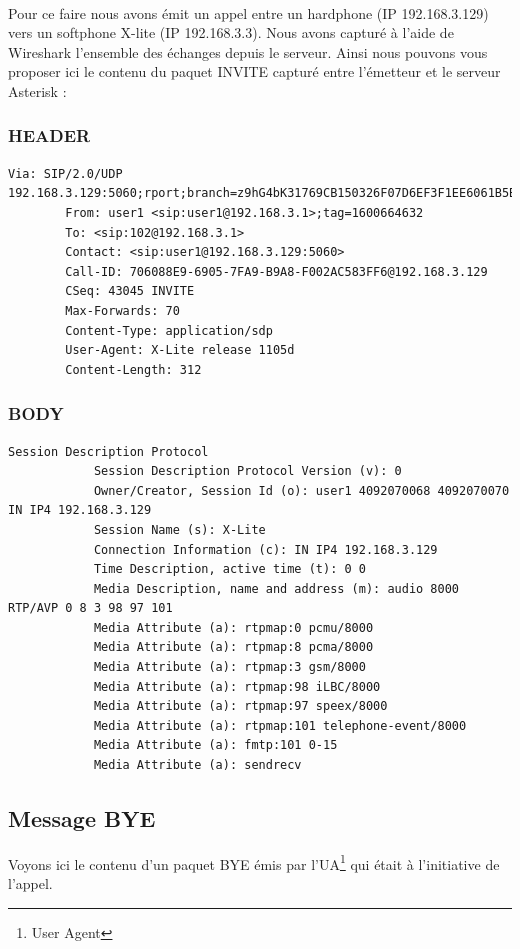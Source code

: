 \documentclass[12pt,a4paper,notitlepage]{article}
\begin{document}
\paragraph{}Pour ce faire nous avons émit un appel entre un hardphone (IP 192.168.3.129) vers un softphone X-lite (IP 192.168.3.3). Nous avons capturé à l'aide de Wireshark l'ensemble des échanges depuis le serveur. Ainsi nous pouvons vous proposer ici le contenu du paquet INVITE capturé entre l'émetteur et le serveur Asterisk :
\subsubsection{HEADER}
\begin{lstlisting}[title=Contenu du HEADER d'un paquet INVITE de SIP]
 Via: SIP/2.0/UDP 192.168.3.129:5060;rport;branch=z9hG4bK31769CB150326F07D6EF3F1EE6061B5B
        From: user1 <sip:user1@192.168.3.1>;tag=1600664632
        To: <sip:102@192.168.3.1>
        Contact: <sip:user1@192.168.3.129:5060>
        Call-ID: 706088E9-6905-7FA9-B9A8-F002AC583FF6@192.168.3.129
        CSeq: 43045 INVITE
        Max-Forwards: 70
        Content-Type: application/sdp
        User-Agent: X-Lite release 1105d
        Content-Length: 312
\end{lstlisting}

\subsubsection{BODY}
\begin{lstlisting}[title=Contenu du BODY d'un paquet INVITE de SIP]
Session Description Protocol
            Session Description Protocol Version (v): 0
            Owner/Creator, Session Id (o): user1 4092070068 4092070070 IN IP4 192.168.3.129
            Session Name (s): X-Lite
            Connection Information (c): IN IP4 192.168.3.129
            Time Description, active time (t): 0 0
            Media Description, name and address (m): audio 8000 RTP/AVP 0 8 3 98 97 101
            Media Attribute (a): rtpmap:0 pcmu/8000
            Media Attribute (a): rtpmap:8 pcma/8000
            Media Attribute (a): rtpmap:3 gsm/8000
            Media Attribute (a): rtpmap:98 iLBC/8000
            Media Attribute (a): rtpmap:97 speex/8000
            Media Attribute (a): rtpmap:101 telephone-event/8000
            Media Attribute (a): fmtp:101 0-15
            Media Attribute (a): sendrecv
\end{lstlisting}

\subsection{Message BYE} 
Voyons ici le contenu d'un paquet BYE émis par l'UA\footnote{User Agent} qui était à l'initiative de l'appel.
\end{document}
